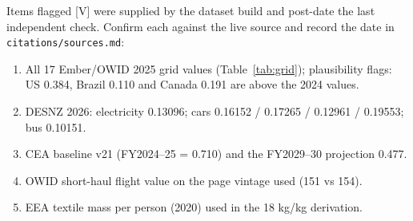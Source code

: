 \documentclass[11pt,a4paper]{article}
\begin{document}
Items flagged [V] were supplied by the dataset build and post-date the
last independent check. Confirm each against the live source and record
the date in \texttt{citations/sources.md}:
\begin{enumerate}
  \item All 17 Ember/OWID 2025 grid values (Table~\ref{tab:grid});
        plausibility flags: US 0.384, Brazil 0.110 and Canada 0.191 are
        above the 2024 values.
  \item DESNZ 2026: electricity 0.13096; cars 0.16152 / 0.17265 /
        0.12961 / 0.19553; bus 0.10151.
  \item CEA baseline v21 (FY2024--25 = 0.710) and the FY2029--30
        projection 0.477.
  \item OWID short-haul flight value on the page vintage used (151 vs 154).
  \item EEA textile mass per person (2020) used in the 18 kg/kg derivation.
\end{enumerate}
\end{document}
